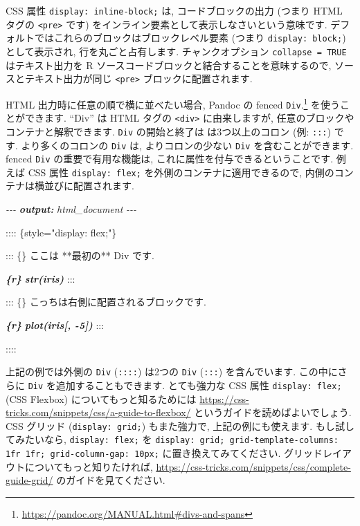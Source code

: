 \documentclass[
  11pt,
  lualatex,ja=standard,jafont=noto]{bxjsreport}
\newenvironment{Shaded}{\begin{snugshade}}{\end{snugshade}}
\newcommand{\AnnotationTok}[1]{\textcolor[rgb]{0.56,0.35,0.01}{\textbf{\textit{#1}}}}
\newcommand{\CommentTok}[1]{\textcolor[rgb]{0.56,0.35,0.01}{\textit{#1}}}
\newcommand{\InformationTok}[1]{\textcolor[rgb]{0.56,0.35,0.01}{\textbf{\textit{#1}}}}
\newcommand{\NormalTok}[1]{#1}
\renewcommand{\href}[2]{#2\footnote{\url{#1}}}
\begin{document}
CSS 属性 \texttt{display: inline-block;}  は, コードブロックの出力 (つまり HTML タグの \texttt{\textless{}pre\textgreater{}} です) をインライン要素として表示しなさいという意味です. デフォルトではこれらのブロックはブロックレベル要素 (つまり \texttt{display: block;}) として表示され, 行を丸ごと占有します. チャンクオプション \texttt{collapse = TRUE} はテキスト出力を R ソースコードブロックと結合することを意味するので, ソースとテキスト出力が同じ \texttt{\textless{}pre\textgreater{}} ブロックに配置されます.

HTML 出力時に任意の順で横に並べたい場合, Pandoc の \href{https://pandoc.org/MANUAL.html\#divs-and-spans}{fenced \texttt{Div}.} を使うことができます. ``Div'' は HTML タグの \texttt{\textless{}div\textgreater{}} に由来しますが, 任意のブロックやコンテナと解釈できます. \texttt{Div} の開始と終了は は3つ以上のコロン (例: \texttt{:::}) です. より多くのコロンの \texttt{Div} は, よりコロンの少ない \texttt{Div} を含むことができます. fenced \texttt{Div} の重要で有用な機能は, これに属性を付与できるということです. 例えば CSS 属性 \texttt{display: flex;} を外側のコンテナに適用できるので, 内側のコンテナは横並びに配置されます.

\begin{Shaded}
\begin{Highlighting}[]
\CommentTok{{-}{-}{-}}
\AnnotationTok{output:}\CommentTok{ html\_document}
\CommentTok{{-}{-}{-}}

\NormalTok{:::: \{style="display: flex;"\}}

\NormalTok{::: \{\}}
\NormalTok{ここは **最初の** Div です.}

\InformationTok{\textasciigrave{}\textasciigrave{}\textasciigrave{}\{r\}}
\InformationTok{str(iris)}
\InformationTok{\textasciigrave{}\textasciigrave{}\textasciigrave{}}
\NormalTok{:::}

\NormalTok{::: \{\}}
\NormalTok{こっちは右側に配置されるブロックです.}

\InformationTok{\textasciigrave{}\textasciigrave{}\textasciigrave{}\{r\}}
\InformationTok{plot(iris[, {-}5])}
\InformationTok{\textasciigrave{}\textasciigrave{}\textasciigrave{}}
\NormalTok{:::}

\NormalTok{::::}
\end{Highlighting}
\end{Shaded}

上記の例では外側の \texttt{Div} (\texttt{::::}) は2つの \texttt{Div} (\texttt{:::}) を含んでいます. この中にさらに \texttt{Div} を追加することもできます. とても強力な CSS 属性 \texttt{display: flex;} (CSS Flexbox) についてもっと知るためには \url{https://css-tricks.com/snippets/css/a-guide-to-flexbox/} というガイドを読めばよいでしょう. CSS グリッド (\texttt{display: grid;}) もまた強力で, 上記の例にも使えます. もし試してみたいなら, \texttt{display: flex;} を \texttt{display: grid; grid-template-columns: 1fr 1fr; grid-column-gap: 10px;} に置き換えてみてください. グリッドレイアウトについてもっと知りたければ, \url{https://css-tricks.com/snippets/css/complete-guide-grid/} のガイドを見てください.
\end{document}
